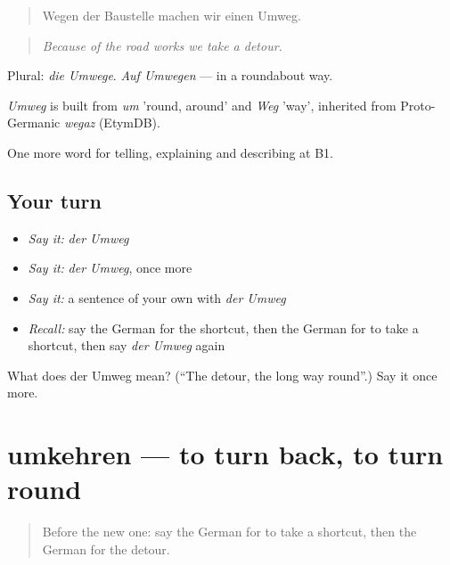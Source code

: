 \begin{quote}
Wegen der Baustelle machen wir einen Umweg.
\end{quote}

\begin{quote}
\emph{Because of the road works we take a detour.}
\end{quote}

Plural: \emph{die Umwege}. \emph{Auf Umwegen} — in a roundabout way.

\begin{cousinweb}
\emph{Umweg} is built from \emph{um} 'round, around' and \emph{Weg} 'way', inherited from Proto-Germanic \emph{wegaz} (EtymDB).
\end{cousinweb}

\begin{grammarlens}[title={What you've built}]
One more word for telling, explaining and describing at B1.
\end{grammarlens}

\subsection*{Your turn}
\begin{itemize}
\raggedright
  \item \emph{Say it:} \emph{der Umweg}
  \item \emph{Say it:} \emph{der Umweg}, once more
  \item \emph{Say it:} a sentence of your own with \emph{der Umweg}
  \item \emph{Recall:} say the German for the shortcut, then the German for to take a shortcut, then say \emph{der Umweg} again
\end{itemize}

\begin{tcolorbox}[breakable,colback=teal!4,colframe=teal!35!black,title={Before you move on}]
What does der Umweg mean? (\textquotedblleft{}The detour, the long way round\textquotedblright{}.) Say it once more.
\end{tcolorbox}
\section[umkehren]{umkehren — to turn back, to turn round}

\label{lesson:GE-C435-umkehren}



\begin{quote}
Before the new one: say the German for to take a shortcut, then the German for the detour.
\end{quote}


